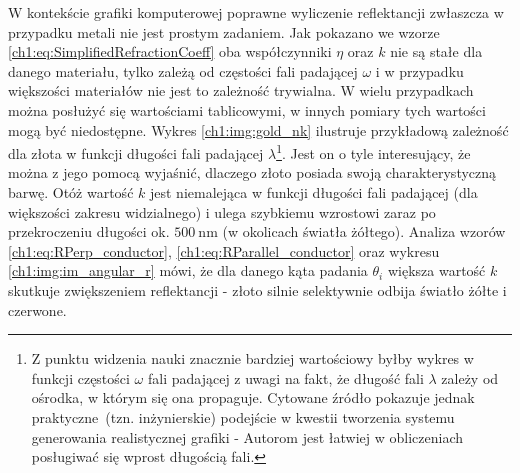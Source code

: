 W kontekście grafiki komputerowej poprawne wyliczenie reflektancji zwłaszcza w przypadku metali nie jest prostym zadaniem. Jak pokazano we wzorze \eqref{ch1:eq:SimplifiedRefractionCoeff} oba współczynniki $\eta$ oraz $k$ nie są stałe dla danego materiału, tylko zależą od częstości fali padającej $\omega$ i w przypadku większości materiałów nie jest to zależność trywialna. W wielu przypadkach można posłużyć się wartościami tablicowymi, w innych pomiary tych wartości mogą być niedostępne. Wykres \ref{ch1:img:gold_nk} ilustruje przykładową zależność dla złota w funkcji długości fali padającej $\lambda$\footnote{Z punktu widzenia nauki znacznie bardziej wartościowy byłby wykres w funkcji częstości $\omega$ fali padającej z uwagi na fakt, że długość fali $\lambda$ zależy od ośrodka, w którym się ona propaguje. Cytowane źródło pokazuje jednak praktyczne~(tzn. inżynierskie) podejście w kwestii tworzenia systemu generowania realistycznej grafiki - Autorom jest łatwiej w obliczeniach posługiwać się wprost długością fali. }. Jest on o tyle interesujący, że można z jego pomocą wyjaśnić, dlaczego złoto posiada swoją charakterystyczną barwę. Otóż wartość $k$ jest niemalejąca w funkcji długości fali padającej (dla większości zakresu widzialnego) i ulega szybkiemu wzrostowi zaraz po przekroczeniu długości ok. $500\ \mathrm{nm}$ (w okolicach światła żółtego). Analiza wzorów \eqref{ch1:eq:RPerp_conductor}, \eqref{ch1:eq:RParallel_conductor} oraz wykresu \ref{ch1:img:im_angular_r} mówi, że dla danego kąta padania $\theta_i$ większa wartość $k$ skutkuje zwiększeniem reflektancji - złoto silnie selektywnie odbija światło żółte i czerwone.




